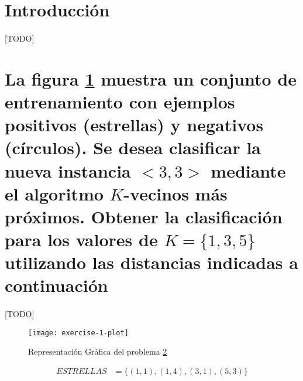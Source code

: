 \documentclass{article}
\begin{document}
	\maketitle %

	\thispagestyle{fancy} %



	\begin{abstract}
		\noindent [TODO ]
	\end{abstract}



	\section{Introducción}
	\label{sec:introducción}

		\paragraph{}
		[TODO]

	\section{La figura \ref{e1:plot} muestra un conjunto de entrenamiento con ejemplos positivos (estrellas) y negativos (círculos). Se desea clasificar la nueva instancia $<3,3>$ mediante el algoritmo $K$-vecinos más próximos. Obtener la clasificación para los valores de $K=\{ 1, 3, 5\}$ utilizando las distancias indicadas a continuación}
	\label{sec:e1}

		\paragraph{}
		[TODO]

		\begin{figure}[h]
			\begin{center}
				\texttt{[image: exercise-1-plot]}
			\end{center}
			\caption{Representación Gráfica del problema \ref{sec:e1}}
			\label{e1:plot}
		\end{figure}

		\begin{align}
		\label{eq:estrellas}
			ESTRELLAS &= \{(1,1), (1,4), (3,1), (5,3)\}
		\end{align}
\end{document}
